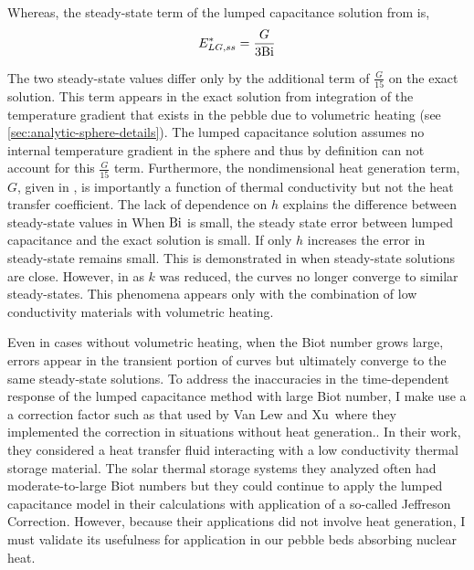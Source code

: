 Whereas, the steady-state term of the lumped capacitance solution from  is,
\begin{equation}
	E^*_{LG,ss} = \frac{G}{3\mathrm{Bi}}
\end{equation}

The two steady-state values differ only by the additional term of $\frac{G}{15}$ on the exact solution. This term appears in the exact solution from integration of the temperature gradient that exists in the pebble due to volumetric heating (see \cref{sec:analytic-sphere-details}). The lumped capacitance solution assumes no internal temperature gradient in the sphere and thus by definition can not account for this $\frac{G}{15}$ term. Furthermore, the nondimensional heat generation term, $G$, given in , is importantly a function of thermal conductivity but not the heat transfer coefficient. The lack of dependence on $h$ explains the difference between steady-state values in   When $\mathrm{Bi}$ is small, the steady state error between lumped capacitance and the exact solution is small. If only $h$ increases the error in steady-state remains small. This is demonstrated in  when steady-state solutions are close. However, in  as $k$ was reduced, the curves no longer converge to similar steady-states. This phenomena appears only with the combination of low conductivity materials with volumetric heating.

Even in cases without volumetric heating, when the Biot number grows large, errors appear in the transient portion of curves but ultimately converge to the same steady-state solutions. To address the inaccuracies in the time-dependent response of the lumped capacitance method with large Biot number, I make use a a correction factor such as that used by Van Lew and Xu\etal~where they implemented the correction in situations without heat generation.\cite{VanLew2010,Xu2012}. In their work, they considered a heat transfer fluid interacting with a low conductivity thermal storage material. The solar thermal storage systems they analyzed often had moderate-to-large Biot numbers but they could continue to apply the lumped capacitance model in their calculations with application of a so-called Jeffreson Correction.\cite{jeffreson409} However, because their applications did not involve heat generation, I must validate its usefulness for application in our pebble beds absorbing nuclear heat.





